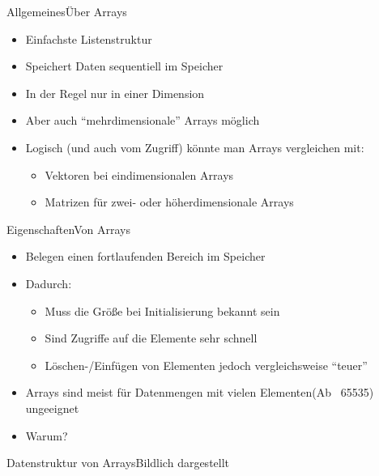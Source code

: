 \begin{frame}{Allgemeines}{Über Arrays}
	\begin{itemize}
		\item Einfachste Listenstruktur
		\item Speichert Daten sequentiell im Speicher
		\item In der Regel nur in einer Dimension
		\item Aber auch "`mehrdimensionale"' Arrays möglich
		\item Logisch (und auch vom Zugriff) könnte man Arrays vergleichen mit:
		\begin{itemize}
			\item Vektoren bei eindimensionalen Arrays
			\item Matrizen für zwei- oder höherdimensionale Arrays
		\end{itemize}
	\end{itemize}
\end{frame}

\begin{frame}{Eigenschaften}{Von Arrays}
	\begin{itemize}
		\item Belegen einen fortlaufenden Bereich im Speicher
		\item Dadurch:
		\begin{itemize}
			\item Muss die Größe bei Initialisierung bekannt sein
			\item Sind Zugriffe auf die Elemente sehr schnell
			\item Löschen-/Einfügen von Elementen jedoch vergleichsweise "`teuer"'
		\end{itemize}
		\item Arrays sind meist für Datenmengen mit vielen Elementen(Ab ~65535) ungeeignet
		\item Warum?
	\end{itemize}
\end{frame}

\begin{frame}{Datenstruktur von Arrays}{Bildlich dargestellt}
\end{frame}

